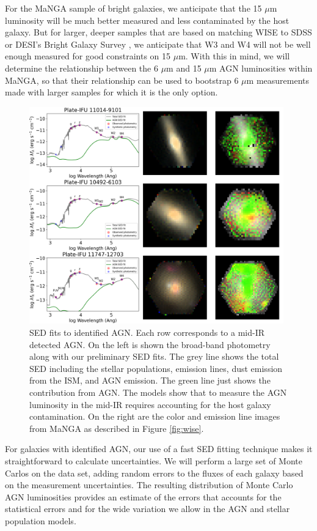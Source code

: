\documentclass[12pt, preprint]{hacked-aastex}
\begin{document}
For the MaNGA sample of bright galaxies, we anticipate that the 15
$\mu$m luminosity will be much better measured and less contaminated
by the host galaxy.  But for larger, deeper samples that are based on
matching WISE to SDSS or DESI's Bright Galaxy Survey \cite{assef18a,
  hviding22a}, we anticipate that W3 and W4 will not be well enough
measured for good constraints on 15 $\mu$m.  With this in mind, we
will determine the relationship between the 6 $\mu$m and 15 $\mu$m AGN
luminosities within MaNGA, so that their relationship can be used to
bootstrap 6 $\mu$m measurements made with larger samples for which it
is the only option.

\begin{figure}[t!]
\includegraphics[width=0.98\textwidth]{spec-grid.png}
    \caption{
\label{fig:fits} \small SED fits to identified AGN. Each row
corresponds to a mid-IR detected AGN. On the left is shown the
broad-band photometry along with our preliminary SED fits.  The grey
line shows the total SED including the stellar populations, emission
lines, dust emission from the ISM, and AGN emission. The green line
just shows the contribution from AGN. The models show that to measure
the AGN luminosity in the mid-IR requires accounting for the host
galaxy contamination.  On the right are the color and emission line
images from MaNGA as described in Figure \ref{fig:wise}.}
\end{figure}

For galaxies with identified AGN, our use of a fast SED fitting
technique makes it straightforward to calculate uncertainties.  We
will perform a large set of Monte Carlos on the data set, adding
random errors to the fluxes of each galaxy based on the measurement
uncertainties. The resulting distribution of Monte Carlo AGN
luminosities provides an estimate of the errors that accounts for the
statistical errors and for the wide variation we allow in the AGN and
stellar population models.
\end{document}
